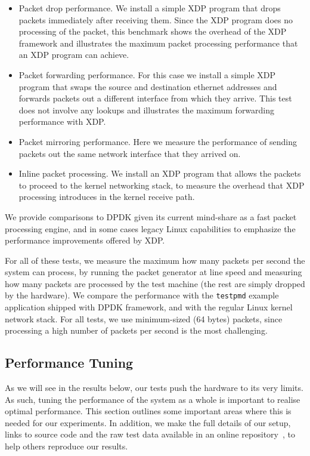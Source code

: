\documentclass[10pt,sigconf]{acmart}
\begin{document}
\begin{itemize}
\item Packet drop performance. We install a simple XDP program that drops
  packets immediately after receiving them. Since the XDP program does no
  processing of the packet, this benchmark shows the overhead of the XDP
  framework and illustrates the maximum packet processing performance that an
  XDP program can achieve.

\item Packet forwarding performance. For this case we install a simple XDP
  program that swaps the source and destination ethernet addresses and forwards
  packets out a different interface from which they arrive. This test does not
  involve any lookups and illustrates the maximum forwarding performance with
  XDP.

\item Packet mirroring performance. Here we measure the performance of sending
  packets out the same network interface that they arrived on.

\item Inline packet processing. We install an XDP program that allows the
  packets to proceed to the kernel networking stack, to measure the overhead
  that XDP processing introduces in the kernel receive path.
\end{itemize}

We provide comparisons to DPDK given its current mind-share as a fast packet
processing engine, and in some cases legacy Linux capabilities to emphasize the
performance improvements offered by XDP.

For all of these tests, we measure the maximum how many packets per second the
system can process, by running the packet generator at line speed and measuring
how many packets are processed by the test machine (the rest are simply dropped
by the hardware). We compare the performance with the \texttt{testpmd} example
application shipped with DPDK framework, and with the regular Linux kernel
network stack. For all tests, we use minimum-sized (64 bytes) packets, since
processing a high number of packets per second is the most challenging.

\subsection{Performance Tuning}
\label{sec:performance-tuning}

As we will see in the results below, our tests push the hardware to its very
limits. As such, tuning the performance of the system as a whole is important to
realise optimal performance. This section outlines some important areas where
this is needed for our experiments. In addition, we make the full details of our
setup, links to source code and the raw test data available in an online
repository~\cite{test-data}, to help others reproduce our results.
\end{document}
